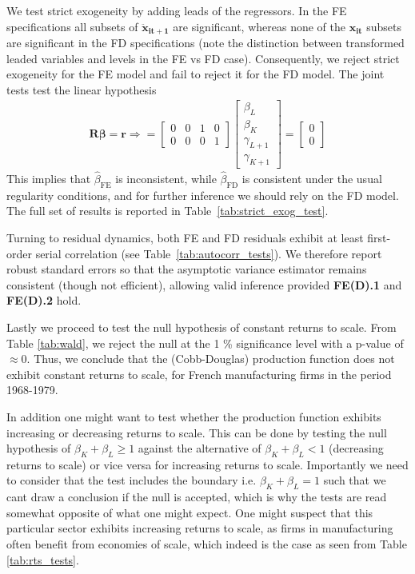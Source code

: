 We test strict exogeneity by adding leads of the regressors. In the FE specifications all subsets of $\bm{\ddot{x}_{it+1}}$ are significant, whereas none of the $\bm{x_{it}}$ subsets are significant in the FD specifications (note the distinction between transformed leaded variables and levels in the FE vs FD case). Consequently, we reject strict exogeneity for the FE model and fail to reject it for the FD model. The joint tests test the linear hypothesis 
\begin{align*}
    \bm{R} \bm{\beta} = \bm{r} \Longrightarrow = \begin{bmatrix}
0 & 0 & 1 & 0 \\
0 & 0 & 0 & 1
\end{bmatrix} \begin{bmatrix}
\beta_L \\ \beta_K \\ \gamma_{L+1} \\ \gamma_{K+1}
\end{bmatrix} = \begin{bmatrix}
0 \\ 0
\end{bmatrix} 
\end{align*}
This implies that $\hat{\beta}_{\text{FE}}$ is inconsistent, while $\hat{\beta}_{\text{FD}}$ is consistent under the usual regularity conditions, and for further inference we should rely on the FD model. The full set of results is reported in Table~\ref{tab:strict_exog_test}. 



Turning to residual dynamics, both FE and FD residuals exhibit at least first-order serial correlation (see Table~\ref{tab:autocorr_tests}). We therefore report robust standard errors so that the asymptotic variance estimator remains consistent (though not efficient), allowing valid inference provided \textbf{FE(D).1} and \textbf{FE(D).2} hold.

Lastly we proceed to test the null hypothesis of constant returns to scale. From Table \ref{tab:wald}, we reject the null at the 1 \% significance level with a p-value of $\approx 0$. Thus, we conclude that the (Cobb-Douglas) production function does not exhibit constant returns to scale, for French manufacturing firms in the period 1968-1979. 



In addition one might want to test whether the production function exhibits increasing or decreasing returns to scale. This can be done by testing the null hypothesis of $\beta_K + \beta_L \geq 1$ against the alternative of $\beta_K + \beta_L < 1$ (decreasing returns to scale) or vice versa for increasing returns to scale. Importantly we need to consider that the test includes the boundary i.e. $\beta_K + \beta_L = 1$ such that we cant draw a conclusion if the null is accepted, which is why the tests are read somewhat opposite of what one might expect. One might suspect that this particular sector exhibits increasing returns to scale, as firms in manufacturing often benefit from economies of scale, which indeed is the case as seen from Table \ref{tab:rts_tests}.


